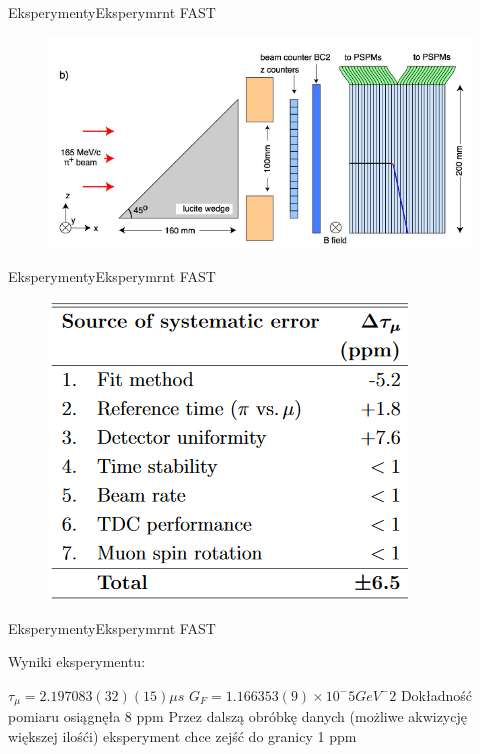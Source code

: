 \documentclass[xcolor={dvipsnames}]{beamer}
\begin{document}
\begin{frame}{Eksperymenty}{Eksperymrnt FAST}

    \begin{figure}
        \includegraphics[scale=0.8]{fast2.PNG}
    \end{figure}


\end{frame}

\begin{frame}{Eksperymenty}{Eksperymrnt FAST}

    \begin{figure}
        \includegraphics[scale=1]{fast3.PNG}
    \end{figure}

\end{frame}

\begin{frame}{Eksperymenty}{Eksperymrnt FAST}

    Wyniki eksperymentu:

    \begin{outline}[enumerate]
        \1 $\tau_\mu = 2.197 083 (32) (15) \mu s$
        \1 $G_F = 1.166 353 (9) \times 10^-5 GeV^-2$
        \1 Dokładność pomiaru osiągnęła 8 ppm
        \1 Przez dalszą obróbkę danych (możliwe akwizycję większej ilośći) eksperyment chce zejść do granicy 1 ppm
    \end{outline}

\end{frame}
\end{document}
